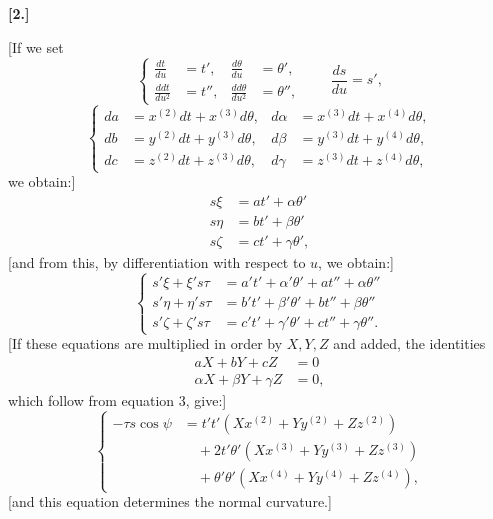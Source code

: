 %

\begin{center}\bfseries [2.]\end{center}
\noindent\hspace*{1.2em}[If we set
\begin{equation}\tag*{[10]}
\left\{\begin{aligned}
\frac{dt}{du}&=t',&\frac{d\theta}{du}&=\theta',\\
\frac{ddt}{du^2}&=t'',&\frac{dd\theta}{du^2}&=\theta'',
\end{aligned}\right.\qquad \frac{ds}{du}=s',
\end{equation}
\begin{equation}\tag*{[11]}
\left\{\begin{aligned}
da&=x^{(2)}dt+x^{(3)}d\theta,&d\alpha&=x^{(3)}dt+x^{(4)}d\theta,\\
db&=y^{(2)}dt+y^{(3)}d\theta,&d\beta&=y^{(3)}dt+y^{(4)}d\theta,\\
dc&=z^{(2)}dt+z^{(3)}d\theta,&d\gamma&=z^{(3)}dt+z^{(4)}d\theta,
\end{aligned}\right.
\end{equation}
we obtain:]
\[
\begin{aligned}
s\xi&=at'+\alpha\theta'\\
s\eta&=bt'+\beta\theta'\\
s\zeta&=ct'+\gamma\theta',
\end{aligned}
\]
[and from this, by differentiation with respect to $u$, we obtain:]
\begin{equation}\tag*{[12]}
\left\{\begin{aligned}
s'\xi+\xi's\tau&=a't'+\alpha'\theta'+at''+\alpha\theta''\\
s'\eta+\eta's\tau&=b't'+\beta'\theta'+bt''+\beta\theta''\\
s'\zeta+\zeta's\tau&=c't'+\gamma'\theta'+ct''+\gamma\theta''.
\end{aligned}\right.
\end{equation}
[If these equations are multiplied in order by $X,Y,Z$ and added, the identities
\[
\begin{aligned}
aX+bY+cZ&=0\\
\alpha X+\beta Y+\gamma Z&=0,
\end{aligned}
\]
which follow from equation 3, give:]
\begin{equation}\tag*{[13]}
\left\{\begin{aligned}
-\tau s\cos\psi&=t't'(Xx^{(2)}+Yy^{(2)}+Zz^{(2)})\\
&\quad+2t'\theta'(Xx^{(3)}+Yy^{(3)}+Zz^{(3)})\\
&\quad+\theta'\theta'(Xx^{(4)}+Yy^{(4)}+Zz^{(4)}),
\end{aligned}\right.
\end{equation}
[and this equation determines the normal curvature.]
